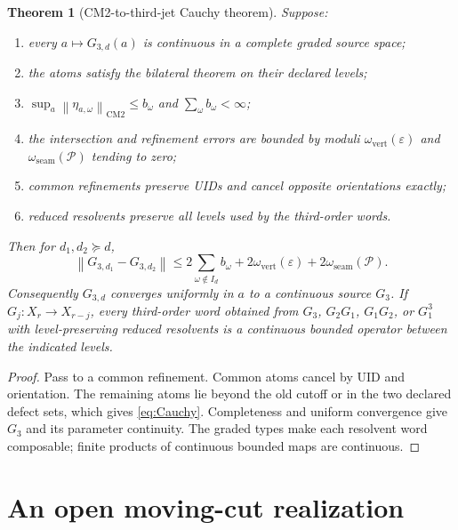 \documentclass[11pt,reqno]{amsart}
\newtheorem{theorem}{Theorem}[section]
\theoremstyle{definition}
\theoremstyle{remark}
\newcommand{\norm}[1]{\left\lVert #1\right\rVert}
\begin{document}
\begin{theorem}[CM2-to-third-jet Cauchy theorem]\label{thm:u3}
Suppose:
\begin{enumerate}[label=(\roman*)]
\item every $a\mapsto G_{3,d}(a)$ is continuous in a complete graded source
space;
\item the atoms satisfy the bilateral theorem on their declared levels;
\item $\sup_a\norm{\eta_{a,\omega}}_{\mathrm{CM2}}\le b_\omega$ and
$\sum_\omega b_\omega<\infty$;
\item the intersection and refinement errors are bounded by moduli
$\omega_{\mathrm{vert}}(\varepsilon)$ and
$\omega_{\mathrm{seam}}(\mathcal P)$ tending to zero;
\item common refinements preserve UIDs and cancel opposite orientations
exactly;
\item reduced resolvents preserve all levels used by the third-order words.
\end{enumerate}
Then for $d_1,d_2\succeq d$,
\begin{equation}\label{eq:Cauchy}
 \norm{G_{3,d_1}-G_{3,d_2}}
 \le2\sum_{\omega\notin I_d}b_\omega
 +2\omega_{\mathrm{vert}}(\varepsilon)
 +2\omega_{\mathrm{seam}}(\mathcal P).
\end{equation}
Consequently $G_{3,d}$ converges uniformly in $a$ to a continuous source
$G_3$.  If $G_j:X_r\to X_{r-j}$, every third-order word obtained from
$G_3$, $G_2G_1$, $G_1G_2$, or $G_1^3$ with level-preserving reduced
resolvents is a continuous bounded operator between the indicated levels.
\end{theorem}

\begin{proof}
Pass to a common refinement.  Common atoms cancel by UID and orientation.
The remaining atoms lie beyond the old cutoff or in the two declared defect
sets, which gives \eqref{eq:Cauchy}.  Completeness and uniform convergence give
$G_3$ and its parameter continuity.  The graded types make each resolvent word
composable; finite products of continuous bounded maps are continuous.
\end{proof}

\section{An open moving-cut realization}\label{sec:actual}
\end{document}
